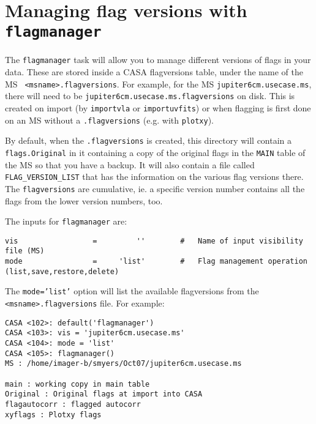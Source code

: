 \section{Managing flag versions with {\tt flagmanager}}
\label{section:edit.flagmanager}

The {\tt flagmanager} task will allow you to manage different
versions of flags in your data.  These are stored inside a CASA
flagversions table, under the name of the MS {\tt
  <msname>.flagversions}. 
For example, for the MS {\tt jupiter6cm.usecase.ms}, there will need
to be {\tt jupiter6cm.usecase.ms.flagversions} on disk.  This is
created on import (by {\tt importvla} or {\tt importuvfits}) or
when flagging is first done on an MS without a {\tt .flagversions}
(e.g. with {\tt plotxy}).  

By default, when the {\tt .flagversions} is created, this
directory will contain a {\tt flags.Original} in it containing
a copy of the original flags in the {\tt MAIN} table of the MS
so that you have a backup.  It will also contain a file called
{\tt FLAG\_VERSION\_LIST} that has the information on the various
flag versions there. The {\tt flagversions} are cumulative, ie. a
specific version number contains all the flags from the lower version
numbers, too. 

The inputs for {\tt flagmanager} are:
\small
\begin{verbatim}
vis                 =         ''        #   Name of input visibility file (MS)
mode                =     'list'        #   Flag management operation (list,save,restore,delete)
\end{verbatim}
\normalsize

The {\tt mode='list'} option will list the available flagversions from
the {\tt <msname>.flagversions} file.  For example:
\small
\begin{verbatim}
CASA <102>: default('flagmanager')
CASA <103>: vis = 'jupiter6cm.usecase.ms'
CASA <104>: mode = 'list'
CASA <105>: flagmanager()
MS : /home/imager-b/smyers/Oct07/jupiter6cm.usecase.ms

main : working copy in main table
Original : Original flags at import into CASA
flagautocorr : flagged autocorr
xyflags : Plotxy flags
\end{verbatim}
\normalsize

